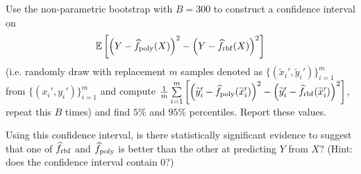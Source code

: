 \documentclass{article}
\newcommand{\1}{\mathbf{1}}
\newcommand{\E}{\mathbb{E}}
\begin{document}
{  \medskip
  
  Use the non-parametric bootstrap with $B=300$ to construct a confidence interval on
  \[
    \E\left[ \left(Y-\widehat{f}_{\rm poly}(X)\right)^2 - \left(Y-\widehat{f}_{\rm rbf}(X)\right)^2 \right]
  \]
  (i.e. randomly draw with replacement $m$ samples denoted as $\{(\widetilde{x}_i',\widetilde{y}_i')\}_{i=1}^m$ from $\{(x_i',y_i')\}_{i=1}^m$ and compute $\frac{1}{m} \sum\limits_{i=1}^m \left[ \left(\widetilde{y}_i'-\widehat{f}_{\rm poly}(\widetilde{x}_i')\right)^2 - \left(\widetilde{y}_i'-\widehat{f}_{\rm rbf}(\widetilde{x}_i')\right)^2 \right]$, repeat this $B$ times) and find $5\%$ and $95\%$ percentiles. Report these values.
  
  \medskip
  
  Using this confidence interval, is there statistically significant evidence to suggest that one of $\widehat{f}_{\rm rbf}$ and $\widehat{f}_{\rm poly}$ is better than the other at predicting $Y$ from $X$? (Hint: does the confidence interval contain $0$?)

}
\end{document}
